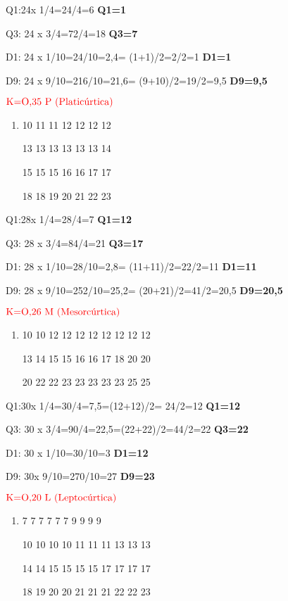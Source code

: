 \documentclass[]{book}
\begin{document}
Q1:24x 1/4=24/4=6 \textbf{Q1=1}

Q3: 24 x 3/4=72/4=18 \textbf{Q3=7}

D1: 24 x 1/10=24/10=2,4= (1+1)/2=2/2=1 \textbf{D1=1}

D9: 24 x 9/10=216/10=21,6= (9+10)/2=19/2=9,5 \textbf{D9=9,5}

\(\color{red}{\text{K=O,35 P (Platicúrtica)}}\)

\begin{enumerate}
\def\labelenumi{\alph{enumi})}
\setcounter{enumi}{4}
\item
  10 11 11 12 12 12 12

  13 13 13 13 13 13 14

  15 15 15 16 16 17 17

  18 18 19 20 21 22 23
\end{enumerate}

Q1:28x 1/4=28/4=7 \textbf{Q1=12}

Q3: 28 x 3/4=84/4=21 \textbf{Q3=17}

D1: 28 x 1/10=28/10=2,8= (11+11)/2=22/2=11 \textbf{D1=11}

D9: 28 x 9/10=252/10=25,2= (20+21)/2=41/2=20,5 \textbf{D9=20,5}

\(\color{red}{\text{K=O,26  M (Mesorcúrtica)}}\)

\begin{enumerate}
\def\labelenumi{\alph{enumi})}
\setcounter{enumi}{5}
\item
  10 10 12 12 12 12 12 12 12 12

  13 14 15 15 16 16 17 18 20 20

  20 22 22 23 23 23 23 23 25 25
\end{enumerate}

Q1:30x 1/4=30/4=7,5=(12+12)/2= 24/2=12 \textbf{Q1=12}

Q3: 30 x 3/4=90/4=22,5=(22+22)/2=44/2=22 \textbf{Q3=22}

D1: 30 x 1/10=30/10=3 \textbf{D1=12}

D9: 30x 9/10=270/10=27 \textbf{D9=23}

\(\color{red}{\text{K=O,20 L (Leptocúrtica)}}\)

\begin{enumerate}
\def\labelenumi{\alph{enumi})}
\setcounter{enumi}{6}
\item
  7 7 7 7 7 7 9 9 9 9

  10 10 10 10 11 11 11 13 13 13

  14 14 15 15 15 15 17 17 17 17

  18 19 20 20 21 21 21 22 22 23
\end{enumerate}
\end{document}
